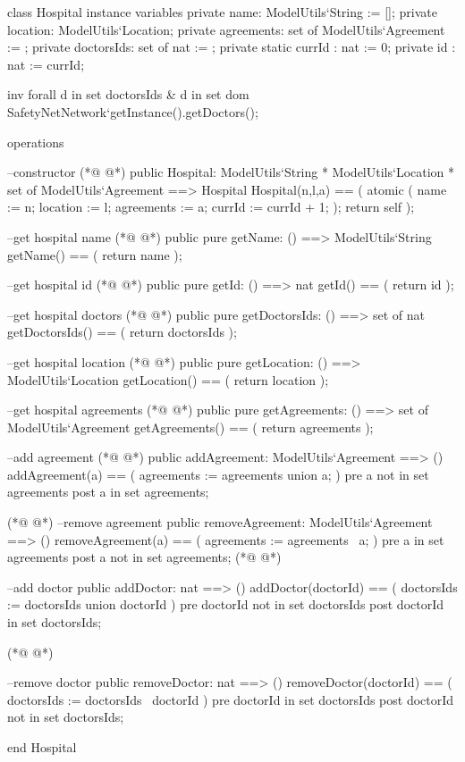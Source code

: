 \begin{vdmpp}[breaklines=true]
class Hospital
instance variables
 private name: ModelUtils`String := [];
 private location: ModelUtils`Location;
 private agreements: set of ModelUtils`Agreement := {};
 private doctorsIds: set of nat := {};
 private static currId : nat := 0;
 private id : nat := currId;
 
 inv forall d in set doctorsIds & d in set dom SafetyNetNetwork`getInstance().getDoctors();
 
operations

 --constructor
(*@
\label{Hospital:15}
@*)
 public Hospital: ModelUtils`String * ModelUtils`Location * set of ModelUtils`Agreement ==> Hospital
 Hospital(n,l,a) == (
  atomic (
   name := n;
   location := l;
   agreements := a;
   currId := currId + 1;
  ); 
  return self 
 );

 --get hospital name 
(*@
\label{getName:27}
@*)
 public pure getName: () ==> ModelUtils`String
 getName() == (
  return name
 );
 
 --get hospital id
(*@
\label{getId:33}
@*)
 public pure getId: () ==> nat
 getId() == (
  return id
 );
 
 --get hospital doctors
(*@
\label{getDoctorsIds:39}
@*)
 public pure getDoctorsIds: () ==> set of nat
 getDoctorsIds() == (
  return doctorsIds
 );
 
 --get hospital location
(*@
\label{getLocation:45}
@*)
 public pure getLocation: () ==> ModelUtils`Location
 getLocation() == (
  return location
 );
 
 --get hospital agreements
(*@
\label{getAgreements:51}
@*)
 public pure getAgreements: () ==> set of ModelUtils`Agreement
 getAgreements() == (
  return agreements
 );
 
 --add agreement
(*@
\label{addAgreement:57}
@*)
 public addAgreement: ModelUtils`Agreement ==> ()
 addAgreement(a) == (
  agreements := agreements union {a};
 )
 pre a not in set agreements
 post a in set agreements; 
 
 
(*@
\label{removeAgreement:65}
@*)
 --remove agreement
 public removeAgreement: ModelUtils`Agreement ==> ()
 removeAgreement(a) == (
  agreements := agreements \ {a};
 )
 pre a in set agreements
 post a not in set agreements; 
(*@
\label{addDoctor:72}
@*)
 
 --add doctor
 public addDoctor: nat ==> ()
 addDoctor(doctorId) == (
  doctorsIds := doctorsIds union {doctorId}
 )
 pre doctorId not in set doctorsIds
 post doctorId in set doctorsIds; 

(*@
\label{removeDoctor:81}
@*)
 
 --remove doctor 
 public removeDoctor: nat ==> ()
 removeDoctor(doctorId) == (
  doctorsIds := doctorsIds \ {doctorId}
 )
 pre doctorId in set doctorsIds
 post doctorId not in set doctorsIds; 

end Hospital
\end{vdmpp}

